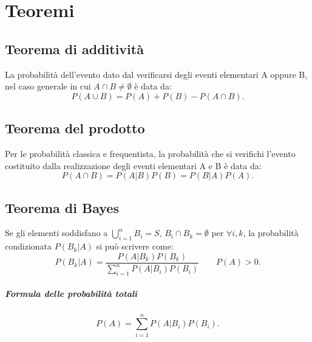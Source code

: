 \chapter{Teoremi} %
\section{Teorema di additività} %
\label{sec:th-add}
La probabilità dell'evento dato dal verificarsi degli eventi elementari A oppure B, nel caso generale in cui $A \cap B \ne \emptyset$ è data da:
\begin{equation}
P(A\cup B)=P(A)+P(B)-P(A\cap B).
\end{equation}

\section{Teorema del prodotto} %
\label{sec:th-prod}
Per le probabilità classica e frequentista, la probabilità che si verifichi l'evento costituito dalla realizzazione degli eventi elementari A e B è data da:
\begin{equation}
P(A\cap B)=P(A|B)P(B)=P(B|A)P(A).
\end{equation}

\section{Teorema di Bayes} %
\label{sec:th-bayes}
Se gli elementi soddisfano a $\bigcup _{ i=1 }^{ n }{ B_{ i } } =S$, ${ B }_{ i }\cap { B }_{ k }=\emptyset $ per $\forall i,k$, la probabilità condizionata $P({ B }_{ k }|A)$ si può scrivere come:
\begin{equation}
P({ B }_{ k }|A)=\frac { P(A|{ B }_{ k })P({ B }_{ k }) }{ \sum _{ i=1 }^{ n }{ P(A|{ B }_{ i })P({ B }_{ i }) }  } \qquad P(A)>0.
\end{equation}

\paragraph{Formula delle probabilità totali} %
\label{sec:prob-totali}
\begin{equation}
P(A)=\sum _{ i=1 }^{ n }{ P(A|{ B }_{ i })P({ B }_{ i }) } .
\end{equation}

